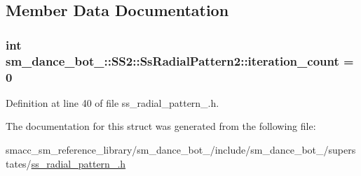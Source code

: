 \subsection{Member Data Documentation}
\subsubsection[{\texorpdfstring{iteration\+\_\+count}{iteration_count}}]{\setlength{\rightskip}{0pt plus 5cm}int sm\+\_\+dance\+\_\+bot\+\_\+::\+S\+S2\+::\+Ss\+Radial\+Pattern2\+::iteration\+\_\+count = 0}\hypertarget{structsm__dance__bot__3_1_1SS2_1_1SsRadialPattern2_ae214d5caeae81f505b2b41e4d6427cd3}{}\label{structsm__dance__bot__3_1_1SS2_1_1SsRadialPattern2_ae214d5caeae81f505b2b41e4d6427cd3}


Definition at line 40 of file ss\+\_\+radial\+\_\+pattern\+\_.\+h.



The documentation for this struct was generated from the following file\+:\begin{DoxyCompactItemize}
\item 
smacc\+\_\+sm\+\_\+reference\+\_\+library/sm\+\_\+dance\+\_\+bot\+\_/include/sm\+\_\+dance\+\_\+bot\+\_/superstates/\hyperlink{3_2include_2sm__dance__bot__3_2superstates_2ss__radial__pattern__2_8h}{ss\+\_\+radial\+\_\+pattern\+\_.\+h}\end{DoxyCompactItemize}
